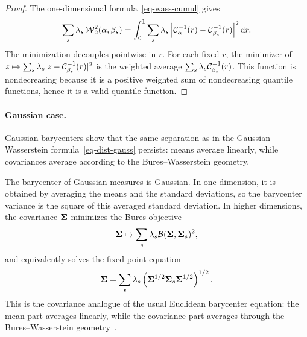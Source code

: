\begin{proof}
	The one-dimensional formula~\eqref{eq-wass-cumul} gives
	\[
		\sum_s\lambda_s\operatorname{\mathcal{W}}_2^2(\alpha,\beta_s)
		=
		\int_0^1
		\sum_s\lambda_s
		\left\lvert\mathcal{C}_{\alpha}^{-1}(r)-\mathcal{C}_{\beta_s}^{-1}(r)\right\rvert^2
		\mathrm{d} r.
	\]
	The minimization decouples pointwise in $r$. For each fixed $r$, the minimizer of $z\mapsto\sum_s\lambda_s|z-\mathcal{C}_{\beta_s}^{-1}(r)|^2$ is the weighted average $\sum_s\lambda_s\mathcal{C}_{\beta_s}^{-1}(r)$. This function is nondecreasing because it is a positive weighted sum of nondecreasing quantile functions, hence it is a valid quantile function.
\end{proof}


\paragraph{Gaussian case.}

Gaussian barycenters show that the same separation as in the Gaussian Wasserstein formula~\eqref{eq-dist-gauss} persists: means average linearly, while covariances average according to the Bures--Wasserstein geometry.

\begin{example}
	The barycenter of Gaussian measures is Gaussian. In one dimension, it is obtained by averaging the means and the standard deviations, so the barycenter variance is the square of this averaged standard deviation. In higher dimensions, the covariance $\mathbf{\Sigma}$ minimizes the Bures objective
	\[
		\mathbf{\Sigma} \mapsto \sum_s \lambda_s \mathcal{B}(\mathbf{\Sigma},\mathbf{\Sigma}_s)^2,
	\]
	and equivalently solves the fixed-point equation
	\[
		\mathbf{\Sigma} =
		\sum_s \lambda_s
		\left( \mathbf{\Sigma}^{1/2}\mathbf{\Sigma}_s\mathbf{\Sigma}^{1/2} \right)^{1/2}.
	\]
	This is the covariance analogue of the usual Euclidean barycenter equation: the mean part averages linearly, while the covariance part averages through the Bures--Wasserstein geometry~\cite{alvarez2016fixed,bhatia2018bures}.
\end{example}

